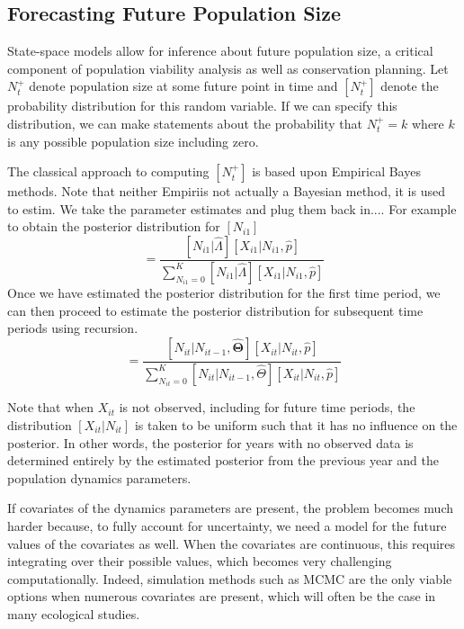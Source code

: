 \documentclass[12pt]{article}
\begin{document}
\subsection{Forecasting Future Population Size}

State-space models allow for inference about future population size,
a critical component of population viability analysis as well
as conservation planning. Let $N^+_{t}$ denote population size at some
future point in time and $[N^+_t]$ denote the probability
distribution for this random variable. If we can specify this
distribution, we can make statements about the
probability that $N^+_t = k$ where $k$ is any possible
population size including zero.

The classical approach to computing $[N^+_t]$ is based upon
Empirical Bayes methods. Note that neither Empiriis not actually a
Bayesian method, it is used to estim.
We take the parameter estimates and plug them back in.... For
example to obtain the posterior distribution for $[N_{i1}]$
\begin{equation}
[\hat{N}_{i1}] = \frac{[N_{i1}|\hat{\Lambda}][X_{i1}|N_{i1},
\hat{p}]}{\sum_{N_{i1}=0}^K
[N_{i1}|\hat{\Lambda}][X_{i1}|N_{i1},\hat{p}]}
  \label{eq:eb1}
\end{equation}
Once we have estimated the posterior distribution for the first
time period, we can then proceed to estimate the posterior
distribution for subsequent time periods using recursion.
\begin{equation}
  [\hat{N}_{it}] =
  \frac{[N_{it}|N_{it-1},\hat{\bm{\Theta}}][X_{it}|N_{it},
\hat{p}]}{\sum_{N_{it}=0}^K [N_{it}|N_{it-1},
\hat{\Theta}][X_{it}|N_{it},\hat{p}]}
  \label{eq:eb2}
\end{equation}

Note that when $X_{it}$ is not observed, including for future
time periods, the distribution $[X_{it}|N_{it}]$ is taken to be
uniform such that it has no influence on the posterior. In other words,
the posterior for years with no observed data is determined entirely
by the estimated posterior from the previous year and the
population dynamics parameters.

If covariates of the dynamics parameters are present, the problem
becomes much harder because, to fully account for uncertainty,
we need a model for the future values of the covariates as well. When
the covariates are continuous, this requires integrating over their
possible values, which becomes very challenging
computationally. Indeed, simulation methods such as MCMC are the
only viable options when numerous covariates are present, which will
often be the case in many ecological studies.
\end{document}
